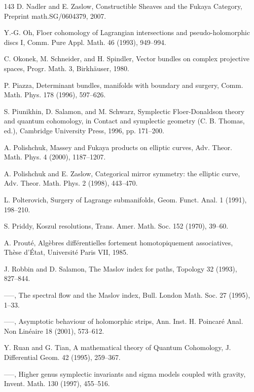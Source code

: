\begin{thebibliography}{143}
 D. Nadler and E. Zaslow, Constructible Sheaves and the Fukaya Category, Preprint math.SG/0604379, 2007.

 Y.-G. Oh, Floer cohomology of Lagrangian intersections and pseudo-holomorphic discs I, Comm. Pure Appl. Math. 46 (1993), 949–994.

 C. Okonek, M. Schneider, and H. Spindler, Vector bundles on complex projective spaces, Progr. Math. 3, Birkhäuser, 1980.

 P. Piazza, Determinant bundles, manifolds with boundary and surgery, Comm. Math. Phys. 178 (1996), 597–626.

 S. Piunikhin, D. Salamon, and M. Schwarz, Symplectic Floer-Donaldson theory and quantum cohomology, in Contact and symplectic geometry (C. B. Thomas, ed.), Cambridge University Press, 1996, pp. 171–200.

 A. Polishchuk, Massey and Fukaya products on elliptic curves, Adv. Theor. Math. Phys. 4 (2000), 1187–1207.

 A. Polishchuk and E. Zaslow, Categorical mirror symmetry: the elliptic curve, Adv. Theor. Math. Phys. 2 (1998), 443–470.

 L. Polterovich, Surgery of Lagrange submanifolds, Geom. Funct. Anal. 1 (1991), 198–210.

 S. Priddy, Koszul resolutions, Trans. Amer. Math. Soc. 152 (1970), 39–60.

 A. Prouté, Algèbres différentielles fortement homotopiquement associatives, Thèse d’État, Université Paris VII, 1985.

 J. Robbin and D. Salamon, The Maslov index for paths, Topology 32 (1993), 827–844.

 —–, The spectral flow and the Maslov index, Bull. London Math. Soc. 27 (1995), 1–33.

 —–, Asymptotic behaviour of holomorphic strips, Ann. Inst. H. Poincaré Anal. Non Linéaire 18 (2001), 573–612.

 Y. Ruan and G. Tian, A mathematical theory of Quantum Cohomology, J. Differential Geom. 42 (1995), 259–367.

 —–, Higher genus symplectic invariants and sigma models coupled with gravity, Invent. Math. 130 (1997), 455–516.


\end{thebibliography}
